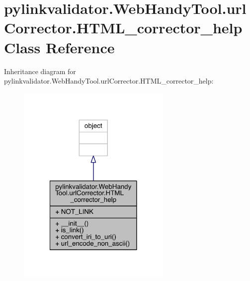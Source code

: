 \hypertarget{classpylinkvalidator_1_1_web_handy_tool_1_1url_corrector_1_1_h_t_m_l__corrector__help}{}\section{pylinkvalidator.\+Web\+Handy\+Tool.\+url\+Corrector.\+H\+T\+M\+L\+\_\+corrector\+\_\+help Class Reference}
\label{classpylinkvalidator_1_1_web_handy_tool_1_1url_corrector_1_1_h_t_m_l__corrector__help}


Inheritance diagram for pylinkvalidator.\+Web\+Handy\+Tool.\+url\+Corrector.\+H\+T\+M\+L\+\_\+corrector\+\_\+help\+:
\nopagebreak
\begin{figure}[H]
\begin{center}
\leavevmode
\includegraphics[width=210pt]{classpylinkvalidator_1_1_web_handy_tool_1_1url_corrector_1_1_h_t_m_l__corrector__help__inherit__graph}
\end{center}
\end{figure}


